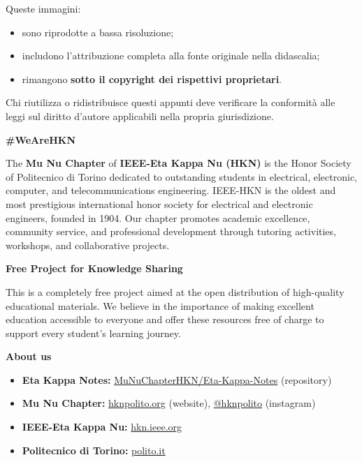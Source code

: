 {    Queste immagini:
    \begin{itemize}[parsep=0pt]
        \item sono riprodotte a bassa risoluzione;
        \item includono l'attribuzione completa alla fonte originale nella didascalia;
        \item rimangono \textbf{sotto il copyright dei rispettivi proprietari}.
    \end{itemize}
    Chi riutilizza o ridistribuisce questi appunti deve verificare la conformità alle leggi sul diritto d'autore applicabili nella propria giurisdizione.

}{  %

    {\Large\textbf{\#WeAreHKN}}
    \vspace{0.2cm}
    \par
    The \textbf{Mu Nu Chapter} of \textbf{IEEE-Eta Kappa Nu (HKN)} is the Honor Society of Politecnico di Torino dedicated to outstanding students in electrical, electronic, computer, and telecommunications engineering.
    IEEE-HKN is the oldest and most prestigious international honor society for electrical and electronic engineers, founded in 1904.
    Our chapter promotes academic excellence, community service, and professional development through tutoring activities, workshops, and collaborative projects.

    \vspace{0.3cm}
    {\large\textbf{Free Project for Knowledge Sharing}}

    This is a completely free project aimed at the open distribution of high-quality educational materials.
    We believe in the importance of making excellent education accessible to everyone and offer these resources free of charge to support every student's learning journey.

    \vspace{0.3cm}
    {\large\textbf{About us}}

    \begin{itemize}
        \item \textbf{Eta Kappa Notes:} \href{https://github.com/MuNuChapterHKN/Eta-Kappa-Notes}{MuNuChapterHKN/Eta-Kappa-Notes} (repository)
        \item \textbf{Mu Nu Chapter:} \href{https://hknpolito.org/}{hknpolito.org} (website), \href{https://www.instagram.com/hknpolito/}{@hknpolito} (instagram)
        \item \textbf{IEEE-Eta Kappa Nu:} \href{https://hkn.ieee.org/}{hkn.ieee.org}
        \item \textbf{Politecnico di Torino:} \href{https://www.polito.it/}{polito.it}
    \end{itemize}

}
